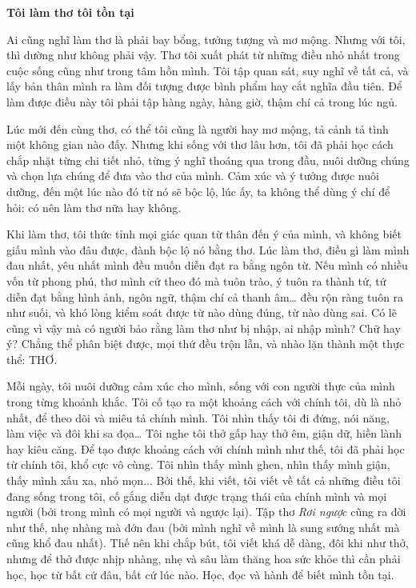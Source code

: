 \documentclass[../main.tex]{subfiles}
\begin{document}
\begin{multicols}{2}

\textbf{Tôi làm thơ tôi tồn tại} 
 
Ai cũng nghĩ làm thơ là phải bay bổng, tưởng tượng và mơ mộng. Nhưng với tôi, thì dường như không phải vậy. Thơ tôi xuất phát từ những điều nhỏ nhất trong cuộc sống cũng như trong tâm hồn mình. Tôi tập quan sát, suy nghĩ về tất cả, và lấy bản thân mình ra làm đối tượng được bình phẩm hay cắt nghĩa đầu tiên. Để làm được điều này tôi phải tập hàng ngày, hàng giờ, thậm chí cả trong lúc ngủ.  
 
Lúc mới đến cùng thơ, có thể tôi cũng là người hay mơ mộng, tả cảnh tả tình một không gian nào đấy. Nhưng khi sống với thơ lâu hơn, tôi đã phải học cách chắp nhặt từng chi tiết nhỏ, từng ý nghĩ thoáng qua trong đầu, nuôi dưỡng chúng và chọn lựa chúng để đưa vào thơ của mình. Cảm xúc và ý tưởng được nuôi dưỡng, đến một lúc nào đó từ nó sẽ bộc lộ, lúc ấy, ta không thể dùng ý chí để hỏi: có nên làm thơ nữa hay không.  
 
Khi làm thơ, tôi thức tỉnh mọi giác quan từ thân đến ý của mình, và không biết giấu mình vào đâu được, đành bộc lộ nó bằng thơ. Lúc làm thơ, điều gì làm mình đau nhất, yêu nhất mình đều muốn diễn đạt ra bằng ngôn từ. Nếu mình có nhiều vốn từ phong phú, thơ mình cứ theo đó mà tuôn trào, ý tuôn ra thành tứ, tứ diễn đạt bằng hình ảnh, ngôn ngữ, thậm chí cả thanh âm… đều rộn ràng tuôn ra như suối, và khó lòng kiểm soát được từ nào dùng đúng, từ nào dùng sai. Có lẽ cũng vì vậy mà có người bảo rằng làm thơ như bị nhập, ai nhập mình? Chữ hay ý? Chẳng thể phân biệt được, mọi thứ đều trộn lẫn, và nhào lặn thành một thực thể: THƠ. 
 
Mỗi ngày, tôi nuôi dưỡng cảm xúc cho mình, sống với con người thực của mình trong từng khoảnh khắc. Tôi cố tạo ra một khoảng cách với chính tôi, dù là nhỏ nhất, để theo dõi và miêu tả chính mình. Tôi nhìn thấy tôi đi đứng, nói năng, làm việc và đôi khi sa đọa… Tôi nghe tôi thở gấp hay thở êm, giận dữ, hiền lành hay kiêu căng. Để tạo được khoảng cách với chính mình như thế, tôi đã phải học từ chính tôi, khổ cực vô cùng. Tôi nhìn thấy mình ghen, nhìn thấy mình giận, thấy mình xấu xa, nhỏ mọn... Bởi thế, khi viết, tôi viết về tất cả những điều tôi đang sống trong tôi, cố gắng diễn dạt được trạng thái của chính mình và mọi người (bởi trong mình có mọi người và ngược lại). Tập thơ \textit{Rơi ngược} cũng ra đời như thế, nhẹ nhàng mà đớn đau (bởi mình nghĩ về mình là sung sướng nhất mà cũng khổ đau nhất). Thế nên khi chắp bút, tôi viết khá dễ dàng, đôi khi như thở, nhưng để thở được nhịp nhàng, nhẹ và sâu làm thăng hoa sức khỏe thì cần phải học, học từ bất cứ đâu, bất cứ lúc nào. Học, đọc và hành để biết mình tồn tại.  
 

\end{multicols}
\end{document}
